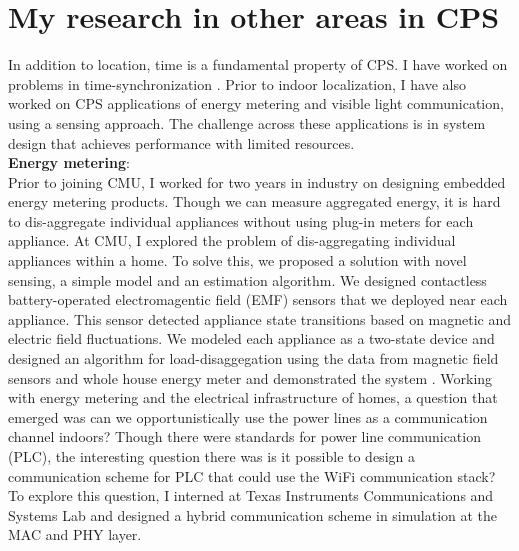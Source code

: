 \documentclass[10pt]{article}
\begin{document}
\section{My research in other areas in CPS}
In addition to location, time is a fundamental property of CPS. I have worked on problems in time-synchronization \cite{buevich2013hardware, dongare2017pulsar, rtas-alps-platform}. Prior to indoor localization, I have also worked on CPS applications of energy metering and visible light communication, using a sensing approach. The challenge across these applications is in system design that achieves performance with limited resources. \\
\textbf{Energy metering}:\\
Prior to joining CMU, I worked for two years in industry on designing embedded energy metering products. %
Though we can measure aggregated energy, it is hard to dis-aggregate individual appliances without using plug-in meters for each appliance. At CMU, I explored the problem of dis-aggregating individual appliances within a home. 
To solve this, we proposed a solution with novel sensing, a simple model and an estimation algorithm. We designed contactless battery-operated electromagentic field (EMF) sensors that we deployed near each appliance. This sensor detected appliance state transitions based on magnetic and electric field fluctuations. We modeled each appliance as a two-state device and designed an algorithm for load-disaggegation using the data from magnetic field sensors and whole house energy meter \cite{rajagopal2013magnetic} and demonstrated the system \cite{rajagopal2013demo}. 
Working with energy metering and the electrical infrastructure of homes, a question that emerged was can we opportunistically use the power lines as a communication channel indoors? Though there were standards for power line communication (PLC), the interesting question there was is it possible to design a communication scheme for PLC that could use the WiFi communication stack? To explore this question, I interned at Texas Instruments Communications and Systems Lab and designed a hybrid communication scheme in simulation at the MAC and PHY layer.\\
\end{document}
